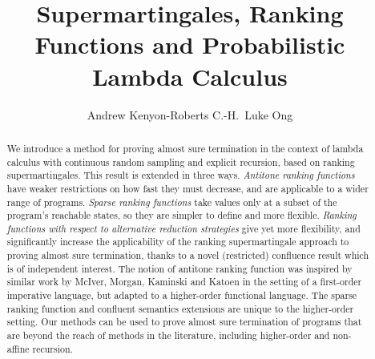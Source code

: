 \documentclass{msc}
\theoremstyle{definition}
\begin{document}





\title{Supermartingales, Ranking Functions and Probabilistic Lambda Calculus}

\begin{authgrp}
    \author{Andrew Kenyon-Roberts \qquad C.-H.~Luke Ong}
\end{authgrp}

\begin{abstract}
We introduce a method for proving almost sure termination in the context of lambda calculus with continuous random sampling and explicit recursion, based on ranking supermartingales. 
This result is extended in three ways. 
\emph{Antitone ranking functions} have weaker restrictions on how fast they must decrease, and are applicable to a wider range of programs. 
\emph{Sparse ranking functions} take values only at a subset of the program's reachable states, so they are simpler to define and more flexible. 
\emph{Ranking functions with respect to alternative reduction strategies} give yet more flexibility, and significantly increase the applicability of the ranking supermartingale approach to proving almost sure termination, thanks to a novel (restricted) confluence result which is of independent interest.
The notion of antitone ranking function was inspired by similar work by McIver, Morgan, Kaminski and Katoen in the setting of a first-order imperative language, but adapted to a higher-order functional language.
The sparse ranking function and confluent semantics extensions are unique to the higher-order setting.
Our methods can be used to prove almost sure termination of programs that are beyond the reach of methods in the literature, including higher-order and non-affine recursion.
\end{abstract}

\maketitle
\end{document}
